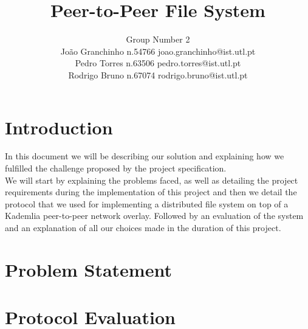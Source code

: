 \documentclass[times,9pt,article]{llncs}
\begin{document}
\title{Peer-to-Peer File System}

\author{Group Number 2 \\
Jo\~ao Granchinho n.54766 joao.granchinho@ist.utl.pt \\
Pedro Torres  n.63506 pedro.torres@ist.utl.pt \\
Rodrigo Bruno n.67074 rodrigo.bruno@ist.utl.pt}
\maketitle


\section{Introduction}
In this document we will be describing our solution and explaining how we fulfilled the challenge proposed by the project specification.\\
We will start by explaining the problems faced, as well as detailing the project requirements during the implementation of this project and then we detail the protocol that we used for implementing a distributed
file system on top of a Kademlia peer-to-peer network overlay. Followed by an evaluation of the system and an explanation of all our choices made in the duration of this project.

\section{Problem Statement}



\section{Protocol Evaluation}
\end{document}
